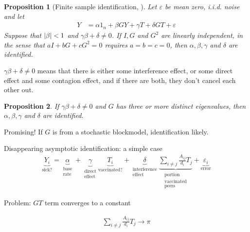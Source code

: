 \documentclass[aspectratio=169]{beamer}
\newtheorem{proposition}{Proposition}
\theoremstyle{remark}
\begin{document}
\begin{frame}
    \begin{proposition}[Finite sample identification, \cite{bramoulle2009}]
        Let $\varepsilon$ be mean zero, i.i.d. noise and let
        \begin{align*}
            Y & = \alpha 1_n + \beta G Y + \gamma T + \delta G T + \varepsilon                        
        \end{align*}
        Suppose that $\lvert\beta\rvert < 1$ and $\gamma \beta + \delta \neq 0$. If $I, G$ and $G^2$ are linearly independent, in the sense that $a I + b G + c G^2 = 0$ requires $a = b = c = 0$, then $\alpha, \beta, \gamma$ and $\delta$ are identified.
    \end{proposition}
    
    $\gamma \beta + \delta \neq 0$ means that there is either some interference effect, or some direct effect and some contagion effect, and if there are both, they don't cancel each other out.
\end{frame}

\begin{frame}
    \begin{proposition}
        If $\gamma \beta + \delta \neq 0$ and $G$ has three or more distinct eigenvalues, then $\alpha, \beta, \gamma$ and $\delta$ are identified.
    \end{proposition}
    
    Promising! If $G$ is from a stochastic blockmodel, identification likely.
\end{frame}

\begin{frame}{Disappearing asymptotic identification: a simple case \citep{li2022c}}
    \begin{align*}
        \underbrace{Y_i}_\text{sick?} =
        \underbrace{\alpha}_{\substack{\text{base}                                    \\ \text{rate}}} +
        \underbrace{\gamma}_{\substack{\text{direct}                                  \\ \text{effect}}}
        \underbrace{T_i}_\text{vaccinated?} + 
        \underbrace{\delta}_{\substack{\text{interference}                            \\ \text{effect}}}
        \underbrace{\sum_{i \neq j} \frac{A_{ij}}{d_i} T_j}_{\substack{\text{portion} \\ \text{vaccinated} \\ \text{peers}}} +
        \underbrace{\varepsilon_i}_\text{error}
    \end{align*}
    
    Problem: $GT$ term converges to a constant
    
    \begin{align*}
        \sum_{i \neq j} \frac{A_{ij}}{d_i} T_j \to \pi                         
    \end{align*}
\end{frame}
\end{document}

